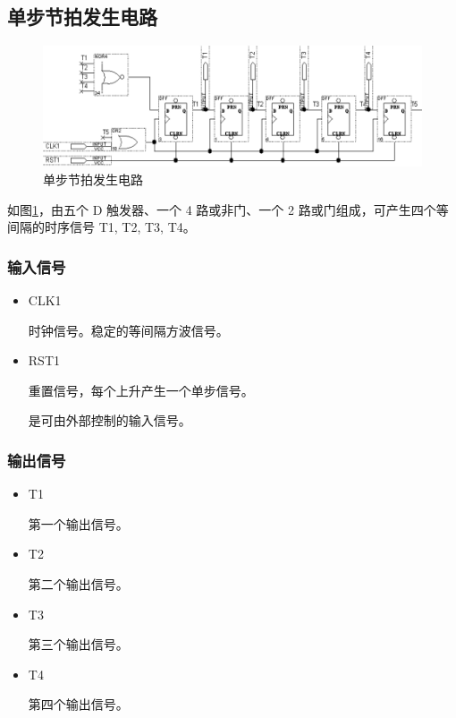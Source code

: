 \subsection{单步节拍发生电路}

\begin{figure}[H]
\centering
\includegraphics[width=\textwidth]{images/prin1_2.png}
\caption{单步节拍发生电路}
\label{fig:prin1_2}
\end{figure}

如图\ref{fig:prin1_2}，由五个 D 触发器、一个 4 路或非门、一个 2 路或门组成，可产生四个等间隔的时序信号 T1, T2, T3, T4。

\subsubsection{输入信号}

\begin{itemize}
    \item CLK1
    
    时钟信号。稳定的等间隔方波信号。
    
    \item RST1
    
    重置信号，每个上升产生一个单步信号。
    
    是可由外部控制的输入信号。
    
\end{itemize} 

\subsubsection{输出信号}

\begin{itemize}
    \item T1
    
    第一个输出信号。
    
    \item T2
    
    第二个输出信号。

    \item T3

    第三个输出信号。

    \item T4
    
    第四个输出信号。

\end{itemize}

